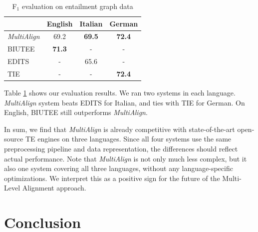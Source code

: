 \documentclass[11pt,letterpaper]{article}
\begin{document}
\begin{table}[t!]
\centering
\small
\begin{tabular}{l|ccc}
              &   English    &   Italian   &  German  \\
\hline
{\em MultiAlign}&   69.2     &   \textbf{69.5}    &   \textbf{72.4}  \\
BIUTEE        &   \textbf{71.3}     &     -       &     -     \\
EDITS         &      -       &   65.6    &     -     \\
TIE           &      -       &     -       &   \textbf{72.4}  \\ 
\end{tabular}
\caption{F$_1$ evaluation on entailment graph data}
\label{table:egraph}
\end{table}

Table \ref{table:egraph} shows our evaluation results. We ran two
systems in each language. {\it MultiAlign} system beats EDITS for
Italian, and ties with TIE for German. On English, BIUTEE still
outperforms {\it MultiAlign}.

\vspace{\baselineskip}

In sum, we find that {\it MultiAlign} is already competitive with
state-of-the-art open-source TE engines on three languages.  Since all
four systems use the same preprocessing pipeline and data
representation, the differences should reflect actual performance.
Note that {\it MultiAlign} is not only much less complex, but it also
one system covering all three languages, without any language-specific
optimizations. We interpret this as a positive sign for the future of
the Multi-Level Alignment approach.

\section{Conclusion}
\end{document}
